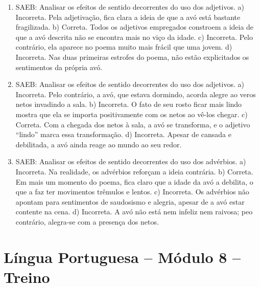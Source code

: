\begin{enumerate}
\item
SAEB: Analisar os efeitos de sentido decorrentes do uso dos adjetivos.
a) Incorreta. Pela adjetivação, fica clara a ideia de que a avó está bastante fragilizada.
b) Correta. Todos os adjetivos empregados constroem a ideia de que a avó descrita não se encontra mais no viço da idade.
c) Incorreta. Pelo contrário, ela aparece no poema muito mais frácil que uma jovem.
d) Incorreta. Nas duas primeiras estrofes do poema, não estão explicitados os sentimentos da própria avó.

\item
SAEB: Analisar os efeitos de sentido decorrentes do uso dos adjetivos.
a) Incorreta. Pelo contrário, a avó, que estava dormindo, acorda alegre ao veros netos invadindo a sala.
b) Incorreta. O fato de seu rosto ficar mais lindo mostra que ela se importa positivamente com os netos ao vê-los chegar.
c) Correta. Com a chegada dos netos à sala, a avó se transforma, e o adjetivo “lindo” marca essa transformação.
d) Incorreta. Apesar de cansada e debilitada, a avó ainda reage ao mundo ao seu redor.

\item
SAEB: Analisar os efeitos de sentido decorrentes do uso dos advérbios.
a) Incorreta. Na realidade, os advérbios reforçam a ideia contrária.
b) Correta. Em mais um momento do poema, fica claro que a idade da avó a debilita, o que a faz ter movimentos trêmulos e lentos.
c) Incorreta. Os advérbios não apontam para sentimentos de saudosismo e alegria, apesar de a avó estar contente na cena.
d) Incorreta. A avó não está nem infeliz nem raivosa; peo contrário, alegra-se com a presença dos netos.
\end{enumerate}

\section*{Língua Portuguesa – Módulo 8 – Treino}

